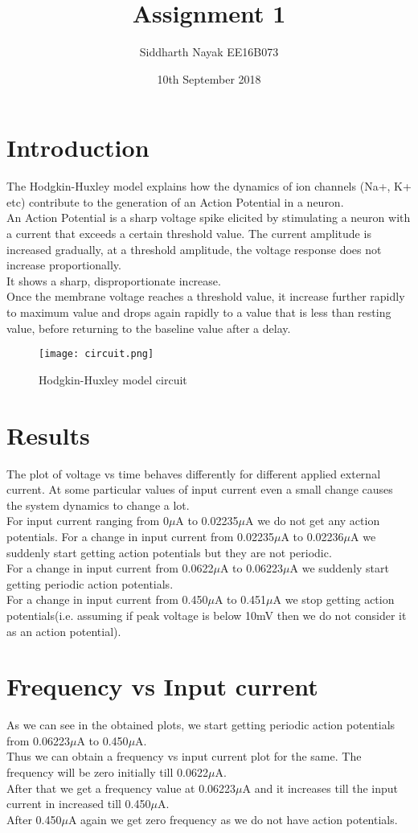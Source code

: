 \documentclass{article}
\title{Assignment 1}
\author{Siddharth Nayak EE16B073}
\date{10th September 2018}
\begin{document}
\maketitle

\section{Introduction}
The Hodgkin-Huxley model explains how the dynamics of ion channels (Na+, K+ etc) contribute to the generation of an Action Potential in a neuron.\\
An Action Potential is a sharp voltage spike elicited by stimulating a neuron with a current that exceeds a certain threshold value. The current amplitude is increased gradually, at a threshold amplitude, the voltage response does not increase proportionally. \\
It shows a sharp, disproportionate increase.\\ Once the membrane voltage reaches a threshold value, it increase further rapidly to maximum value and drops again rapidly to a value that is less than resting value, before returning to the baseline value after a delay.

 
 \begin{figure}[h]
\texttt{[image: circuit.png]}
\caption{Hodgkin-Huxley model circuit}

\end{figure}

\section{Results}
The plot of voltage vs time behaves differently for different applied external current. At some particular values of input current even a small change causes the system dynamics to change a lot.\\
For input current ranging from 0$\mu$A to 0.02235$\mu$A we do not get any action potentials.
For a change in input current from 0.02235$\mu$A to 0.02236$\mu$A we suddenly start getting action potentials but they are not periodic.\\
For a change in input current from 0.0622$\mu$A to 0.06223$\mu$A we suddenly start getting periodic action potentials.\\
For a change in input current from 0.450$\mu$A to 0.451$\mu$A we stop getting action potentials(i.e. assuming if peak voltage is below 10mV then we do not consider it as an action potential).

\section{Frequency vs Input current}
As we can see in the obtained plots, we start getting periodic action potentials from 0.06223$\mu$A to 0.450$\mu$A.\\
Thus we can obtain a frequency vs input current plot for the same. The frequency will be zero initially till 0.0622$\mu$A.\\
After that we get a frequency value at 0.06223$\mu$A and it increases till the input current in increased till 0.450$\mu$A.\\
After 0.450$\mu$A again we get zero frequency as we do not have action potentials.
\newpage
\end{document}
